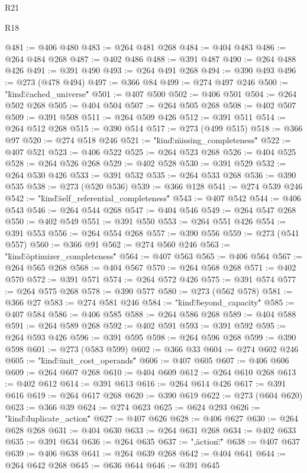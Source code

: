 \begin{lexlean}{R21}
\begin{lexlean}{R18}
\begin{coremodule}
{{{{{{{{{{{{{{{{{{{{{{{{{{{{{{{{{{{{{{{{{{{{{{{{{{{{{{{{{{{{{{{{{{{{{{{{{{{{{{{{{{{{{{{{{{{{{{{{{{{{{{{{{{{{{{{{{{{{{{{{{{{{{{{@481 := @406 @480
@483 := @264 @481 @268
@484 := @404 @483
@486 := @264 @484 @268
@487 := @402 @486
@488 := @391 @487
@490 := @264 @488 @426
@491 := @391 @490
@493 := @264 @491 @268
@494 := @390 @493
@496 := @273 (@478 @494)
@497 := @366 @84
@499 := @274 @497 @246
@500 := "{\"kind\":\"cached_universe\""
@501 := @407 @500
@502 := @406 @501
@504 := @264 @502 @268
@505 := @404 @504
@507 := @264 @505 @268
@508 := @402 @507
@509 := @391 @508
@511 := @264 @509 @426
@512 := @391 @511
@514 := @264 @512 @268
@515 := @390 @514
@517 := @273 (@499 @515)
@518 := @366 @97
@520 := @274 @518 @246
@521 := "{\"kind\":\"missing_completeness\""
@522 := @407 @521
@523 := @406 @522
@525 := @264 @523 @268
@526 := @404 @525
@528 := @264 @526 @268
@529 := @402 @528
@530 := @391 @529
@532 := @264 @530 @426
@533 := @391 @532
@535 := @264 @533 @268
@536 := @390 @535
@538 := @273 (@520 @536)
@539 := @366 @128
@541 := @274 @539 @246
@542 := "{\"kind\":\"self_referential_completeness\""
@543 := @407 @542
@544 := @406 @543
@546 := @264 @544 @268
@547 := @404 @546
@549 := @264 @547 @268
@550 := @402 @549
@551 := @391 @550
@553 := @264 @551 @426
@554 := @391 @553
@556 := @264 @554 @268
@557 := @390 @556
@559 := @273 (@541 @557)
@560 := @366 @91
@562 := @274 @560 @246
@563 := "{\"kind\":\"optimizer_completeness\""
@564 := @407 @563
@565 := @406 @564
@567 := @264 @565 @268
@568 := @404 @567
@570 := @264 @568 @268
@571 := @402 @570
@572 := @391 @571
@574 := @264 @572 @426
@575 := @391 @574
@577 := @264 @575 @268
@578 := @390 @577
@580 := @273 (@562 @578)
@581 := @366 @27
@583 := @274 @581 @246
@584 := "{\"kind\":\"beyond_capacity\""
@585 := @407 @584
@586 := @406 @585
@588 := @264 @586 @268
@589 := @404 @588
@591 := @264 @589 @268
@592 := @402 @591
@593 := @391 @592
@595 := @264 @593 @426
@596 := @391 @595
@598 := @264 @596 @268
@599 := @390 @598
@601 := @273 (@583 @599)
@602 := @366 @33
@604 := @274 @602 @246
@605 := "{\"kind\":\"unit_cost_operands\""
@606 := @407 @605
@607 := @406 @606
@609 := @264 @607 @268
@610 := @404 @609
@612 := @264 @610 @268
@613 := @402 @612
@614 := @391 @613
@616 := @264 @614 @426
@617 := @391 @616
@619 := @264 @617 @268
@620 := @390 @619
@622 := @273 (@604 @620)
@623 := @366 @39
@624 := @274 @623
@625 := @624 @293
@626 := "{\"kind\":\"duplicate_action\""
@627 := @407 @626
@628 := @406 @627
@630 := @264 @628 @268
@631 := @404 @630
@633 := @264 @631 @268
@634 := @402 @633
@635 := @391 @634
@636 := @264 @635
@637 := ",\"action\":\""
@638 := @407 @637
@639 := @406 @638
@641 := @264 @639 @268
@642 := @404 @641
@644 := @264 @642 @268
@645 := @636 @644
@646 := @391 @645
}}}}}}}}}}}}}}}}}}}}}}}}}}}}}}}}}}}}}}}}}}}}}}}}}}}}}}}}}}}}}}}}}}}}}}}}}}}}}}}}}}}}}}}}}}}}}}}}}}}}}}}}}}}}}}}}}}}}}}}}}}}}}}}}}}}}}}
\end{coremodule}
\end{lexlean}
\end{lexlean}
